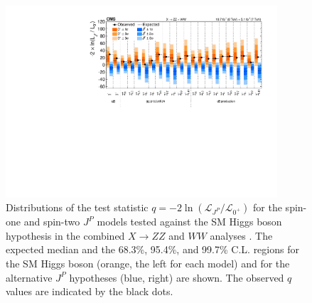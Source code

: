 \begin{figure}
  \centering
    \includegraphics[width=0.9\textwidth]{Conclusion/JP_SummaryPlot_comb.pdf}
    \caption[Distributions of the test statistic $q=-2\ln(\mathcal{L}_{J^P}/\mathcal{L}_{0^+})$
       for the spin-one and spin-two $J^{P}$ models tested against the SM Higgs boson hypothesis
      in the combined $X\to ZZ$ and $WW$ analyses.
      The expected median and the 68.3\%, 95.4\%, and 99.7\% C.L. regions for the SM Higgs boson (orange, the left for each model)
      and for the alternative $J^P$ hypotheses (blue, right) are shown.
     The observed $q$ values are indicated by the black dots.]{
       Distributions of the test statistic $q=-2\ln(\mathcal{L}_{J^P}/\mathcal{L}_{0^+})$
       for the spin-one and spin-two $J^{P}$ models tested against the SM Higgs boson hypothesis
      in the combined $X\to ZZ$ and $WW$ analyses \cite{Khachatryan:2014kca}.
      The expected median and the 68.3\%, 95.4\%, and 99.7\% C.L. regions for the SM Higgs boson (orange, the left for each model)
      and for the alternative $J^P$ hypotheses (blue, right) are shown.
     The observed $q$ values are indicated by the black dots.
      \label{fig:jp_summaryComb}
      }

\end{figure}

